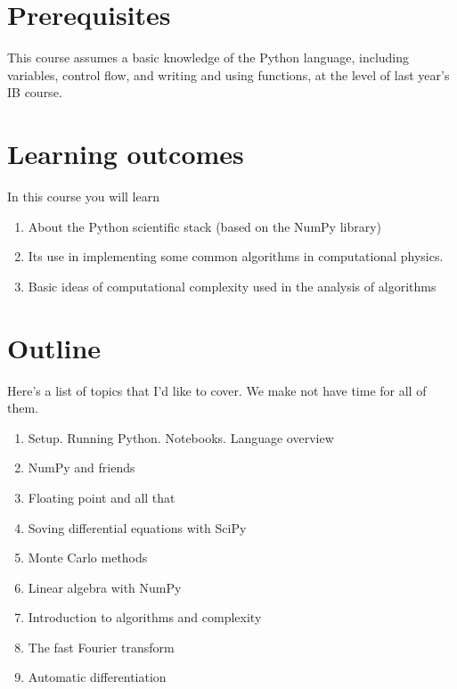 \documentclass[
  letterpaper,
  DIV=11,
  numbers=noendperiod]{scrreprt}
\providecommand{\tightlist}{%
  \setlength{\itemsep}{0pt}\setlength{\parskip}{0pt}}\usepackage{longtable,booktabs,array}
\theoremstyle{definition}
\theoremstyle{remark}
\begin{document}
\hypertarget{prerequisites}{%
\section*{Prerequisites}\label{prerequisites}}


This course assumes a basic knowledge of the Python language, including
variables, control flow, and writing and using functions, at the level
of last year's IB course.

\hypertarget{learning-outcomes}{%
\section*{Learning outcomes}\label{learning-outcomes}}


In this course you will learn

\begin{enumerate}
\def\labelenumi{\arabic{enumi}.}
\tightlist
\item
  About the Python scientific stack (based on the NumPy library)
\item
  Its use in implementing some common algorithms in computational
  physics.
\item
  Basic ideas of computational complexity used in the analysis of
  algorithms
\end{enumerate}

\hypertarget{outline}{%
\section*{Outline}\label{outline}}


Here's a list of topics that I'd like to cover. We make not have time
for all of them.

\begin{enumerate}
\def\labelenumi{\arabic{enumi}.}
\tightlist
\item
  Setup. Running Python. Notebooks. Language overview
\item
  NumPy and friends
\item
  Floating point and all that
\item
  Soving differential equations with SciPy
\item
  Monte Carlo methods
\item
  Linear algebra with NumPy
\item
  Introduction to algorithms and complexity
\item
  The fast Fourier transform
\item
  Automatic differentiation
\end{enumerate}
\end{document}
